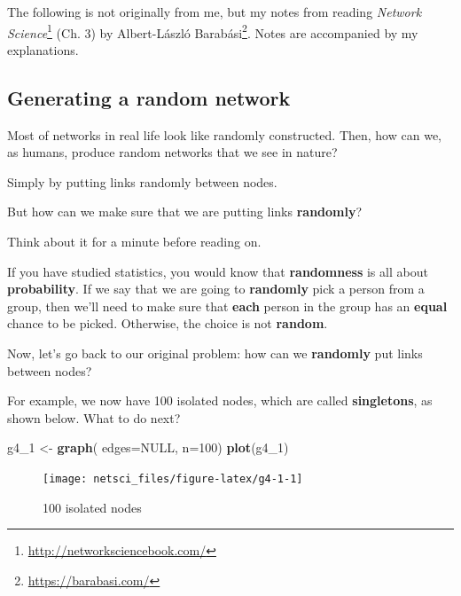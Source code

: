 \documentclass[
]{krantz}
\makeatletter
\newenvironment{Shaded}{\begin{snugshade}}{\end{snugshade}}
\newcommand{\DataTypeTok}[1]{\textcolor[rgb]{0.27,0.27,0.27}{#1}}
\newcommand{\DecValTok}[1]{\textcolor[rgb]{0.06,0.06,0.06}{#1}}
\newcommand{\KeywordTok}[1]{\textcolor[rgb]{0.27,0.27,0.27}{\textbf{#1}}}
\newcommand{\NormalTok}[1]{#1}
\newcommand{\OtherTok}[1]{\textcolor[rgb]{0.37,0.37,0.37}{#1}}
\newcommand{\StringTok}[1]{\textcolor[rgb]{0.5,0.5,0.5}{#1}}
\renewcommand{\href}[2]{#2\footnote{\url{#1}}}
\newenvironment{kframe}{%
\medskip{}
\setlength{\fboxsep}{.8em}
 \def\at@end@of@kframe{}%
 \ifinner\ifhmode%
  \def\at@end@of@kframe{\end{minipage}}%
  \begin{minipage}{\columnwidth}%
 \fi\fi%
 \def\FrameCommand##1{\hskip\@totalleftmargin \hskip-\fboxsep
 \colorbox{shadecolor}{##1}\hskip-\fboxsep
     \hskip-\linewidth \hskip-\@totalleftmargin \hskip\columnwidth}%
 \MakeFramed {\advance\hsize-\width
   \@totalleftmargin\z@ \linewidth\hsize
   \@setminipage}}%
 {\par\unskip\endMakeFramed%
 \at@end@of@kframe}
\renewenvironment{Shaded}{\begin{kframe}}{\end{kframe}}
\newenvironment{rmdblock}[1]
  {
  \begin{itemize}
  \renewcommand{\labelitemi}{
    \raisebox{-.7\height}[0pt][0pt]{
      {\setkeys{Gin}{width=3em,keepaspectratio}\texttt{[image: images/\#1]}}
    }
  }
  \setlength{\fboxsep}{1em}
  \begin{kframe}
  \item
  }
  {
  \end{kframe}
  \end{itemize}
  }
\newenvironment{rmdnote}
  {\begin{rmdblock}{note}}
  {\end{rmdblock}}
\makeatother
\begin{document}
\begin{rmdnote}
The following is not originally from me, but my notes from reading \href{http://networksciencebook.com/}{\emph{Network Science}} (Ch. 3) by \href{https://barabasi.com/}{Albert-László Barabási}. Notes are accompanied by my explanations.
\end{rmdnote}

\hypertarget{generating-a-random-network}{%
\subsection{Generating a random network}\label{generating-a-random-network}}

Most of networks in real life look like randomly constructed. Then, how can we, as humans, produce random networks that we see in nature?

Simply by putting links randomly between nodes.

But how can we make sure that we are putting links \textbf{randomly}?

Think about it for a minute before reading on.

If you have studied statistics, you would know that \textbf{randomness} is all about \textbf{probability}. If we say that we are going to \textbf{randomly} pick a person from a group, then we'll need to make sure that \textbf{each} person in the group has an \textbf{equal} chance to be picked. Otherwise, the choice is not \textbf{random}.

Now, let's go back to our original problem: how can we \textbf{randomly} put links between nodes?

For example, we now have 100 isolated nodes, which are called \textbf{singletons}, as shown below. What to do next?

\begin{Shaded}
\begin{Highlighting}[]
\NormalTok{g4_}\DecValTok{1}\NormalTok{ <-}\StringTok{ }\KeywordTok{graph}\NormalTok{( }\DataTypeTok{edges=}\OtherTok{NULL}\NormalTok{, }\DataTypeTok{n=}\DecValTok{100}\NormalTok{)}
\KeywordTok{plot}\NormalTok{(g4_}\DecValTok{1}\NormalTok{)}
\end{Highlighting}
\end{Shaded}

\begin{figure}

{\centering \texttt{[image: netsci\_files/figure-latex/g4-1-1]} 

}

\caption{100 isolated nodes}\label{fig:g4-1}
\end{figure}
\end{document}
